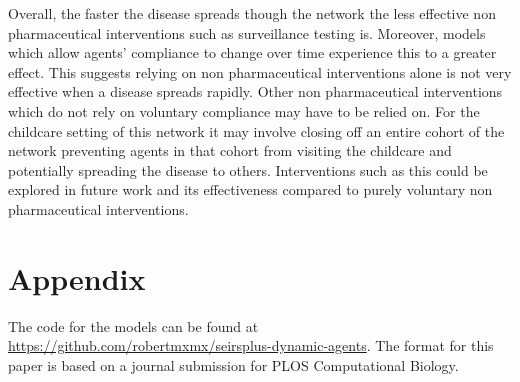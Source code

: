\documentclass{article}
\begin{document}
Overall, the faster the disease spreads though the network the less effective non pharmaceutical interventions such as surveillance testing is. Moreover, models which allow agents’ compliance to change over time experience this to a greater effect. This suggests relying on non pharmaceutical  interventions alone is not very effective when a disease spreads rapidly. Other non pharmaceutical  interventions which do not rely on voluntary compliance may have to be relied on. For the childcare setting of this network it may involve closing off an entire cohort of the network preventing agents in that cohort from visiting the childcare and potentially spreading the disease to others. Interventions such as this could be explored in future work and its effectiveness compared to purely voluntary non pharmaceutical interventions.

\newpage

{}


\newpage
\appendix

\section{Appendix}
The code for the models can be found at \url{https://github.com/robertmxmx/seirsplus-dynamic-agents}.
The format for this paper is based on a journal submission for PLOS Computational Biology.
\end{document}
